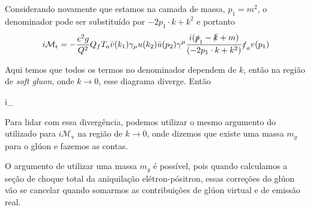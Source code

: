 Considerando novamente que estamos na camada de massa, $p_{1} = m^{2}$, o denominador pode ser substituído por $-2p_{1}\cdot k + k^{2}$ e portanto
    \begin{equation*}
        i\mathcal{M}_{\text{r}} = -\dfrac{e^{2}g}{Q^{2}}Q_{f}T_{a}\bar{v}(k_{1})\gamma_{\mu}u(k_{2})\bar{u}(p_{2})\gamma^{\mu}\dfrac{i(\slashed{p}_{1} - \slashed{k} + m)}{(-2p_{1}\cdot k + k^{2})}\slashed{\varepsilon}_{a} v(p_{1})
    \end{equation*}

Aqui temos que todos os termos no denominador dependem de $k$, então na região de \textit{soft gluon}, onde $k\to0$, esse diagrama diverge. Então
    \begin{answer}\label{eq: answer 8 b}
        i_{} \to {}
    \end{answer}

Para lidar com essa divergência, podemos utilizar o mesmo argumento do utilizado para $i\mathcal{M}_{\text{v}}$ na região de $k\to 0$, onde dizemos que existe uma massa $m_{g}$ para o glúon e fazemos as contas.

O argumento de utilizar uma massa $m_{g}$ é possível, pois quando calculamos a seção de choque total da aniquilação elétron-pósitron, essas correções do glúon vão se cancelar quando somarmos as contribuições de glúon virtual e de emissão real.

\endex